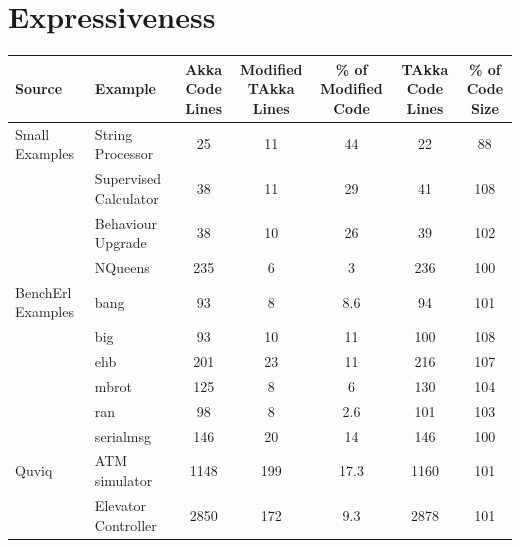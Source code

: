 \section{Expressiveness}
\label{expressiveness}


\begin{table}[!ht]
\begin{center}
\begin{tabular}{| p{3.2 cm} | p{3.5 cm} | c | c |  c | c | c |}
\hline

Source & Example & \specialcell{Akka Code \\ Lines} &
\specialcell{Modified\\ TAkka Lines} & \specialcell{\% of \\Modified Code} &
\specialcell{TAkka Code\\ Lines}
& \specialcell{\% of \\Code Size} \\

\hline
Small Examples  & String Processor & 25 & 11 & 44 & 22 & 88 \\
\cline{2-7}                            
                            & Supervised Calculator &38 & 11 & 29 & 41 & 108 \\ 
\cline{2-7}
                            & Behaviour Upgrade & 38 & 10 & 26 & 39 & 102 \\
\cline{2-7}                            
                            & NQueens & 235 & 6 & 3 & 236 & 100 \\
\cline{2-7}                            
\hline

BenchErl Examples & bang & 93 & 8 & 8.6 & 94 & 101 \\
\cline{2-7}
                            & big & 93 & 10 & 11 & 100 & 108 \\
\cline{2-7}                            
                            & ehb &201 & 23 & 11 & 216 & 107 \\ 
\cline{2-7}                            
                            & mbrot & 125 & 8 & 6 & 130 & 104 \\
\cline{2-7}                            
                            & ran & 98 & 8 & 2.6 & 101 & 103 \\
\cline{2-7}       
                            & serialmsg & 146 & 20 & 14 & 146 & 100 \\
\cline{2-7}       
\hline

\hline
Quviq  & ATM simulator & 1148 & 199 & 17.3 & 1160 & 101 \\
\cline{2-7}
   \citep{quviq}                                  & Elevator Controller &
2850 & 172 & 9.3 & 2878 & 101 \\
\hline



\end{tabular}
\end{center}
\end{table}
